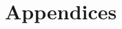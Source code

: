 \documentclass[11pt, a4paper]{article}
\begin{document}
\newpage

\begin{spacing}{0.0}
\tableofcontents
\end{spacing}

\thispagestyle{empty}

\newpage
\setcounter{page}{1}






\newpage



\newpage



\newpage



\newpage



\newpage



\newpage



\newpage









\newpage
\section{Appendices}

\end{document}
